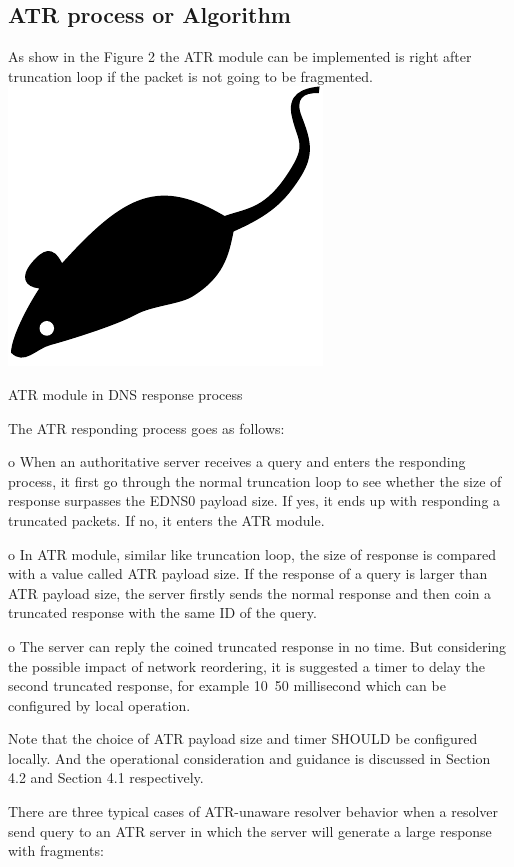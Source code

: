 \subsection{ATR process or Algorithm}

As show in the Figure 2 the ATR module can be implemented is right after truncation loop if the packet is not going to be fragmented.
\centering
\includegraphics{figures/mouse}
\caption{ATR module in DNS response process}

The ATR responding process goes as follows:

   o  When an authoritative server receives a query and enters the
      responding process, it first go through the normal truncation loop
      to see whether the size of response surpasses the EDNS0 payload
      size.  If yes, it ends up with responding a truncated packets.  If
      no, it enters the ATR module.

   o  In ATR module, similar like truncation loop, the size of response
      is compared with a value called ATR payload size.  If the response
      of a query is larger than ATR payload size, the server firstly
      sends the normal response and then coin a truncated response with
      the same ID of the query.

   o  The server can reply the coined truncated response in no time.
      But considering the possible impact of network reordering, it is
      suggested a timer to delay the second truncated response, for
      example 10~50 millisecond which can be configured by local
      operation.

   Note that the choice of ATR payload size and timer SHOULD be
   configured locally.  And the operational consideration and guidance
   is discussed in Section 4.2 and Section 4.1 respectively.

   There are three typical cases of ATR-unaware resolver behavior when a
   resolver send query to an ATR server in which the server will
   generate a large response with fragments:

